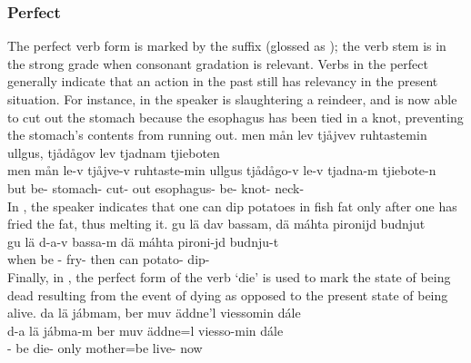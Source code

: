 \subsubsection{Perfect}\label{perfectAspect}
The perfect verb form is marked by the suffix  (glossed as \PRFs); the verb stem is in the strong grade when consonant gradation is relevant. Verbs in the perfect generally indicate that an action in the past still has relevancy in the present situation. For instance, in  the speaker is slaughtering a reindeer, and is now able to cut out the stomach because the esophagus has been tied in a knot, preventing the stomach’s contents from running out. 
\ea\label{perfectEx1}%
\glll	men mån lev tjåjvev ruhtastemin ullgus, tjådågov lev tjadnam tjieboten\\
	men mån le-v tjåjve-v ruhtaste-min ullgus tjådågo-v le-v tjadna-m tjiebote-n\\
	but  be- stomach- cut- out esophagus- be- knot- neck-\\\nopagebreak
{}	
\z
In , the speaker indicates that one can dip potatoes in fish fat only after one has fried the fat, thus melting it.
\ea\label{perfectEx2}%
\glll	gu lä dav bassam, dä máhta pironijd budnjut\\
	gu lä d-a-v bassa-m dä máhta pironi-jd budnju-t\\
	when be\BS{} -\BS{} fry- then can\BS{} potato- dip-\\\nopagebreak
{}	
\z
Finally, in , the perfect form of the verb  ‘die’ is used to mark the state of being dead resulting from the event of dying as opposed to the present state of being alive. 
\ea\label{perfectEx3}%
\glll	da lä jábmam, ber muv äddne'l viessomin dále\\
	d-a lä jábma-m ber muv äddne=l viesso-min dále\\
	-\BS{} be\BS{} die- only  mother\BS{}=be\BS{} live- now\\\nopagebreak
{}	
\z

